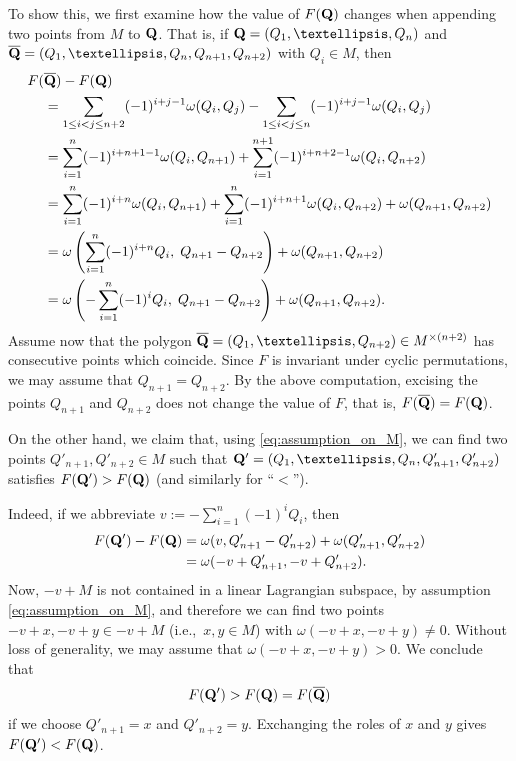 \documentclass[12pt]{article}
\begin{document}
To show this, we first examine how the value of $F({\bf Q})$ changes when appending two points from $M$ to ${\bf Q}$. That is, if ${\bf Q}=(Q_1,\ldots, Q_n)$ and $\overline {\bf Q}=(Q_1,\ldots, Q_n, Q_{n+1}, Q_{n+2})$ with $Q_i \in M$, then
\begin{equation}\nonumber%
\begin{aligned}
F(&\overline {\bf Q})-F({\bf Q})\\
&=\sum_{1\le i < j \le n+2} (-1)^{i+j-1} \omega(Q_i,Q_j)-\sum_{1\le i < j \le n} (-1)^{i+j-1} \omega(Q_i,Q_j)\\
&=\sum_{i=1}^n(-1)^{i+n+1-1} \omega(Q_i,Q_{n+1})+\sum_{i=1}^{n+1}(-1)^{i+n+2-1} \omega(Q_i,Q_{n+2})\\
&=\sum_{i=1}^n(-1)^{i+n} \omega(Q_i,Q_{n+1})+\sum_{i=1}^{n}(-1)^{i+n+1} \omega(Q_i,Q_{n+2})+\omega(Q_{n+1},Q_{n+2})\\
&=\omega\left(\sum_{i=1}^n(-1)^{i+n} Q_i, \; Q_{n+1}-Q_{n+2}\right)+\omega(Q_{n+1},Q_{n+2})\\
&=\omega\left(-\sum_{i=1}^n(-1)^{i} Q_i, \; Q_{n+1}-Q_{n+2}\right)+\omega(Q_{n+1},{Q}_{n+2}).
\end{aligned}
\end{equation}
%
Assume now that the polygon $\overline {\bf Q}=(Q_1,\ldots, Q_{n+2})\in M^{\times (n+2)}$ has consecutive points which coincide. Since $F$ is invariant under cyclic permutations, we may assume that $Q_{n+1}=Q_{n+2}$. %
By the above computation, excising the points $Q_{n+1}$ and $Q_{n+2}$ does not change the value of $F$, that is, $F(\overline {\bf Q})=F({\bf Q})$. 

On the other hand, we claim that, using \eqref{eq:assumption_on_M}, we can find two points $Q'_{n+1}, Q'_{n+2}\in M$ such that $ {\bf Q}' = (Q_1, \ldots , Q_n, Q'_{n+1}, Q'_{n+2})$ satisfies $F({\bf Q}')> F({\bf Q})$ (and similarly for ``$<$'').

Indeed, if we abbreviate $v:=-\sum_{i=1}^n(-1)^{i} Q_i$,  then 
\begin{equation}\nonumber
\begin{aligned}
F({\bf Q}')-F({\bf Q})&=\omega(v, Q'_{n+1}-Q'_{n+2})+\omega(Q'_{n+1},Q'_{n+2})\\
&=\omega(-v+Q'_{n+1},-v+Q'_{n+2}).
\end{aligned}
\end{equation}
Now, $-v+M$ is not contained in a linear Lagrangian subspace, by assumption \eqref{eq:assumption_on_M}, and therefore we can find two points $-v+x, -v+y\in-v+M$ (i.e.,~$x,y\in M$) with $\omega(-v+x,-v+y)\neq0$. Without loss of generality, we may assume that $\omega(-v+x,-v+y)>0$. We conclude that
\begin{equation}\nonumber
F({\bf Q}')>F({\bf Q}) = F(\overline{\bf Q})
\end{equation}
if we choose $Q'_{n+1}=x$ and $Q'_{n+2}=y$. Exchanging the roles of $x$ and $y$ gives $F({\bf Q}')<F({\bf Q})$.
\end{document}
